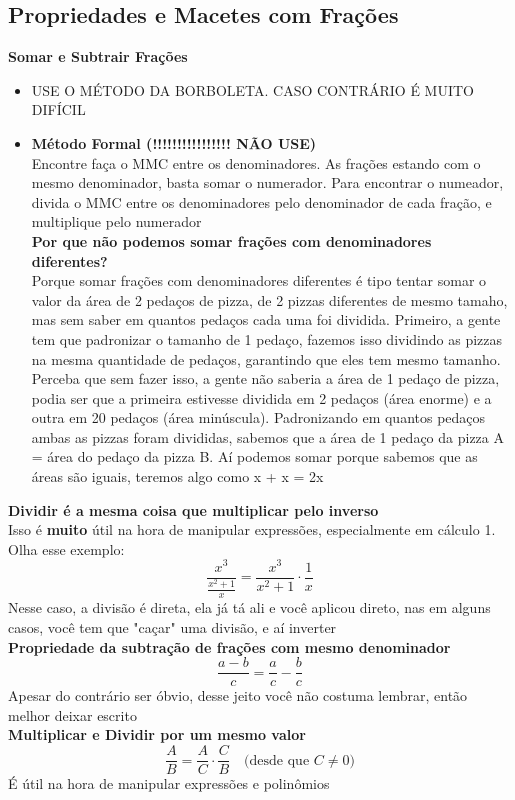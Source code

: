 \documentclass{article}
\begin{document}
\subsection{Propriedades e Macetes com Frações}

\textbf{Somar e Subtrair Frações}
\begin{itemize}
    \item USE O MÉTODO DA BORBOLETA. CASO CONTRÁRIO É MUITO DIFÍCIL
    \item\textbf{Método Formal (!!!!!!!!!!!!!!!! NÃO USE)}
    \\[5pt]
    Encontre faça o MMC entre os denominadores. As frações estando com o mesmo denominador, basta somar o numerador. Para encontrar o numeador, divida o MMC entre os denominadores pelo denominador de cada fração, e multiplique pelo numerador
    \\[10pt]
    \textbf{Por que não podemos somar frações com denominadores diferentes?}
    \\[5pt]
    Porque somar frações com denominadores diferentes é tipo tentar somar o valor da área de 2 pedaços de pizza, de 2 pizzas diferentes de mesmo tamaho, mas sem saber em quantos pedaços cada uma foi dividida. Primeiro, a gente tem que padronizar o tamanho de 1 pedaço, fazemos isso dividindo as pizzas na mesma quantidade de pedaços, garantindo que eles tem mesmo tamanho. Perceba que sem fazer isso, a gente não saberia a área de 1 pedaço de pizza, podia ser que a primeira estivesse dividida em 2 pedaços (área enorme) e a outra em 20 pedaços (área minúscula). Padronizando em quantos pedaços ambas as pizzas foram divididas, sabemos que a área de 1 pedaço da pizza A = área do pedaço da pizza B. Aí podemos somar porque sabemos que as áreas são iguais, teremos algo como x + x = 2x  
\end{itemize}

\textbf{Dividir é a mesma coisa que multiplicar pelo inverso}
\\[5pt]
Isso é \textbf{muito} útil na hora de manipular expressões, especialmente em cálculo 1. Olha esse exemplo:
\\[5pt]
\[
\frac{x^3}{\frac{x^2+1}{x}}=\frac{x^3}{x^2+1}\cdot\frac{1}{x}
\]
Nesse caso, a divisão é direta, ela já tá ali e você aplicou direto, nas em alguns casos, você tem que "caçar" uma divisão, e aí inverter
\\[10pt]
\textbf{Propriedade da subtração de frações com mesmo denominador}
\[
\frac{a - b}{c} = \frac{a}{c} - \frac{b}{c}
\]
Apesar do contrário ser óbvio, desse jeito você não costuma lembrar, então melhor deixar escrito
\\[10pt]
\textbf{Multiplicar e Dividir por um mesmo valor}
\[
\frac{A}{B} = \frac{A}{C} \cdot \frac{C}{B} \quad \text{(desde que } C \neq 0\text{)}
\]
É útil na hora de manipular expressões e polinômios
\\[10pt]
\end{document}
